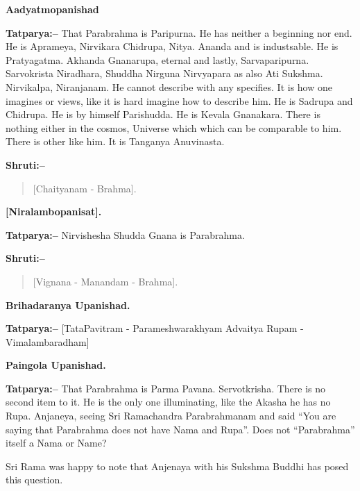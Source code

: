 \begin{flushright}
\textbf{Aadyatmopanishad}
\end{flushright}

\textbf{Tatparya:–} That Parabrahma is Paripurna. He has neither a beginning nor end. He is Aprameya, Nirvikara Chidrupa, Nitya. Ananda and is industsable. He is Pratyagatma. Akhanda Gnanarupa, eternal and lastly, Sarvaparipurna. Sarvokrista Niradhara, Shuddha Nirguna Nirvyapara as also Ati Sukshma. Nirvikalpa, Niranjanam. He cannot describe with any specifies. It is how one imagines or views, like it is hard imagine how to describe him. He is Sadrupa and Chidrupa. He is by himself Parishudda. He is Kevala Gnanakara. There is nothing either in the cosmos, Universe which which can be comparable to him. There is other like him. It is Tanganya Anuvinasta.

\textbf{Shruti:–}

\begin{verse}
[Chaityanam - Brahma].
\end{verse}

\begin{flushright}
\textbf{[Niralambopanisat].}
\end{flushright}

\textbf{Tatparya:–} Nirvishesha Shudda Gnana is Parabrahma.

\textbf{Shruti:–}

\begin{verse}
[Vignana - Manandam - Brahma].
\end{verse}

\begin{flushright}
\textbf{Brihadaranya Upanishad.}
\end{flushright}

\textbf{Tatparya:–} [TataPavitram - Parameshwarakhyam Advaitya Rupam - Vimalambaradham]

\begin{flushright}
\textbf{Paingola Upanishad.}
\end{flushright}

\textbf{Tatparya:–} That Parabrahma is Parma Pavana. Servotkrisha. There is no second item to it. He is the only one illuminating, like the Akasha he has no Rupa. Anjaneya, seeing Sri Ramachandra Parabrahmanam and said “You are saying that Parabrahma does not have Nama and Rupa”. Does not “Parabrahma” itself a Nama or Name?

Sri Rama was happy to note that Anjenaya with his Sukshma Buddhi has posed this question.


